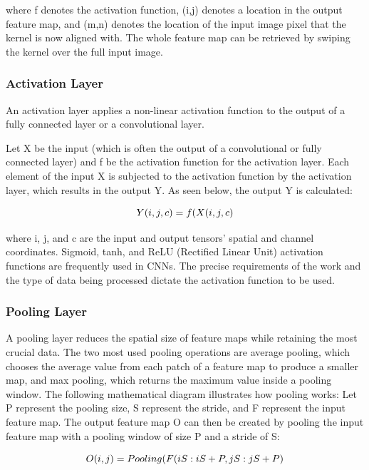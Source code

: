 where f denotes the activation function, (i,j) denotes a location in the output feature map, and (m,n) denotes the location of the input image pixel that the kernel is now aligned with. The whole feature map can be retrieved by swiping the kernel over the full input image.

\subsubsection{Activation Layer}
An activation layer applies a non-linear activation function to the output of a fully connected layer or a convolutional layer.

Let X be the input (which is often the output of a convolutional or fully connected layer) and f be the activation function for the activation layer. Each element of the input X is subjected to the activation function by the activation layer, which results in the output Y. As seen below, the output Y is calculated:

\begin{equation}
\label{eq:activation_layer}
    \textcolor{black}{Y(i,j,c) = f(X(i,j,c)}
\end{equation}

where i, j, and c are the input and output tensors' spatial and channel coordinates. Sigmoid, tanh, and ReLU (Rectified Linear Unit) activation functions are frequently used in CNNs. The precise requirements of the work and the type of data being processed dictate the activation function to be used.

\subsubsection{Pooling Layer}
A pooling layer reduces the spatial size of feature maps while retaining the most crucial data. The two most used pooling operations are average pooling, which chooses the average value from each patch of a feature map to produce a smaller map, and max pooling, which returns the maximum value inside a pooling window. The following mathematical diagram illustrates how pooling works:
Let P represent the pooling size, S represent the stride, and F represent the input feature map. The output feature map O can then be created by pooling the input feature map with a pooling window of size P and a stride of S:

\begin{equation}
\label{eq:pooling_layer}
    \textcolor{black}{O(i,j) = Pooling(F(iS : iS+P,jS : jS+P)}
\end{equation}

